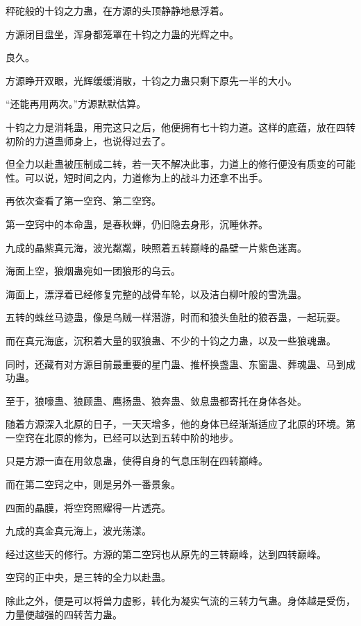 
\begin{this_body}



秤砣般的十钧之力蛊，在方源的头顶静静地悬浮着。

方源闭目盘坐，浑身都笼罩在十钧之力蛊的光辉之中。

良久。

方源睁开双眼，光辉缓缓消散，十钧之力蛊只剩下原先一半的大小。

“还能再用两次。”方源默默估算。

十钧之力是消耗蛊，用完这只之后，他便拥有七十钧力道。这样的底蕴，放在四转初阶的力道蛊师身上，也说得过去了。

但全力以赴蛊被压制成二转，若一天不解决此事，力道上的修行便没有质变的可能性。可以说，短时间之内，力道修为上的战斗力还拿不出手。

再依次查看了第一空窍、第二空窍。

第一空窍中的本命蛊，是春秋蝉，仍旧隐去身形，沉睡休养。

九成的晶紫真元海，波光粼粼，映照着五转巅峰的晶壁一片紫色迷离。

海面上空，狼烟蛊宛如一团狼形的乌云。

海面上，漂浮着已经修复完整的战骨车轮，以及洁白柳叶般的雪洗蛊。

五转的蛛丝马迹蛊，像是乌贼一样潜游，时而和狼头鱼肚的狼吞蛊，一起玩耍。

而在真元海底，沉积着大量的驭狼蛊、不少的十钧之力蛊，以及一些狼魂蛊。

同时，还藏有对方源目前最重要的星门蛊、推杯换盏蛊、东窗蛊、葬魂蛊、马到成功蛊。

至于，狼嚎蛊、狼顾蛊、鹰扬蛊、狼奔蛊、敛息蛊都寄托在身体各处。

随着方源深入北原的日子，一天天增多，他的身体已经渐渐适应了北原的环境。第一空窍在北原的修为，已经可以达到五转中阶的地步。

只是方源一直在用敛息蛊，使得自身的气息压制在四转巅峰。

而在第二空窍之中，则是另外一番景象。

四面的晶膜，将空窍照耀得一片透亮。

九成的真金真元海上，波光荡漾。

经过这些天的修行。方源的第二空窍也从原先的三转巅峰，达到四转巅峰。

空窍的正中央，是三转的全力以赴蛊。

除此之外，便是可以将兽力虚影，转化为凝实气流的三转力气蛊。身体越是受伤，力量便越强的四转苦力蛊。


\end{this_body}
